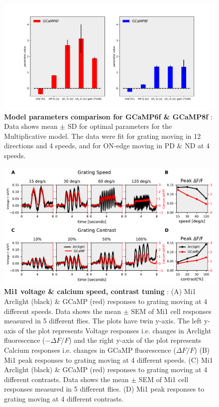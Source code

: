 \documentclass[9pt,lineno]{elife}
\begin{document}
\begin{figure}
\begin{fullwidth}
\includegraphics[width=0.84\linewidth]{figure6}
\caption{\textbf{Model parameters comparison for GCaMP6f \& GCaMP8f} : Data shows mean $\pm$ SD for optimal parameters for the Multiplicative model. The data were fit for grating moving in 12 directions and 4 speeds, and for ON-edge moving in PD \& ND at 4 speeds.}

\label{gcampcomparison}
	
\end{fullwidth}
\end{figure} 

\begin{figure}
\begin{fullwidth}
\includegraphics[width=0.84\linewidth]{figure7}
\caption{\textbf{Mi1 voltage \& calcium speed, contrast tuning} : (A) Mi1 Arclight (black) \& GCaMP (red) responses to grating moving at 4 different speeds. Data shows the mean $\pm$ SEM of Mi1 cell responses measured in 5 different flies. The plots have twin y-axis. The left y-axis of the plot represents Voltage responses i.e. changes in Arclight fluorescence ($-\Delta F/F$) and the right y-axis of the plot represents Calcium responses i.e. changes in GCaMP fluorescence ($\Delta F/F$) (B) Mi1 peak responses to grating moving at 4 different speeds. (C) Mi1 Arclight (black) \& GCaMP (red) responses to grating moving at 4 different contrasts. Data shows the mean $\pm$ SEM of Mi1 cell responses measured in 5 different flies. (D) Mi1 peak responses to grating moving at 4 different contrasts.}

\label{Mi1data}
	
\end{fullwidth}
\end{figure} 
\end{document}
